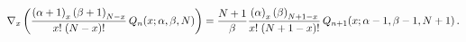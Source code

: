 \[\nabla_{x}\left(\frac{\left(\alpha+1\right)_{x}\left(\beta+1\right)_{N-x}}{x!%
\;(N-x)!}\mathop{Q_{n}\/}\nolimits\!\left(x;\alpha,\beta,N\right)\right)=\frac%
{N+1}{\beta}\frac{\left(\alpha\right)_{x}\left(\beta\right)_{N+1-x}}{x!\;(N+1-%
x)!}\*\mathop{Q_{n+1}\/}\nolimits\!\left(x;\alpha-1,\beta-1,N+1\right).\]